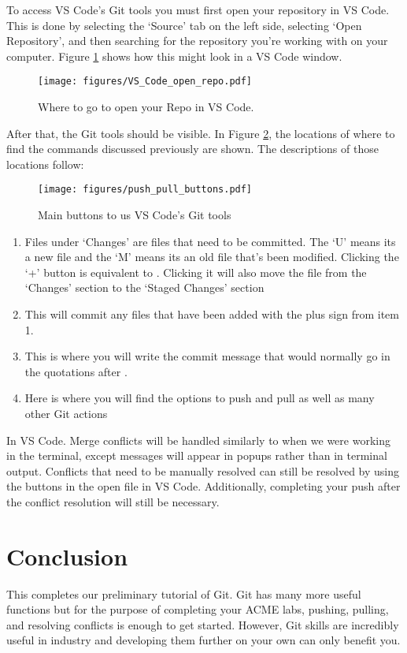 To access VS Code's Git tools you must first open your repository in VS Code. This is done by selecting the `Source' tab on the left side, 
selecting `Open Repository', and then searching for the repository you're working with on your computer. Figure \ref{fig:open_repo} shows 
how this might look in a VS Code window.

\begin{figure}[h]
    \centering
    \caption{Where to go to open your Repo in VS Code.}
    \texttt{[image: figures/VS\_Code\_open\_repo.pdf]}
    \label{fig:open_repo}
\end{figure}

After that, the Git tools should be visible. In Figure \ref{fig:push_pull_buttons}, the locations of where to find the 
commands discussed previously are shown. The descriptions of those locations follow:

\begin{figure}[h]
    \centering
    \caption{Main buttons to us VS Code's Git tools}
    \texttt{[image: figures/push\_pull\_buttons.pdf]}
    \label{fig:push_pull_buttons}
\end{figure}



\begin{enumerate}
    \item Files under `Changes' are files that need to be committed. The `U' means its a new file and the `M' means its an old 
    file that's been modified. Clicking the `+' button is equivalent to . Clicking it will also move 
    the file from the  `Changes' section to the `Staged Changes' section
    \item This will commit any files that have been added with the plus sign from item 1.
    \item This is where you will write the commit message that would normally go in the quotations after .
    \item Here is where you will find the options to push and pull as well as many other Git actions
\end{enumerate}

In VS Code. Merge conflicts will be handled similarly to when we were working in the terminal, except messages will appear in popups rather 
than in terminal output. Conflicts that need to be manually resolved can still be resolved by using the buttons in the open file in VS Code. Additionally, 
completing your push after the conflict resolution will still be necessary. 

\section{Conclusion}

This completes our preliminary tutorial of Git. Git has many more useful functions but for the purpose of completing your ACME labs, pushing, pulling, and resolving
conflicts is enough to get started. However, Git skills are incredibly useful in industry and developing them further on your own can only benefit you.
